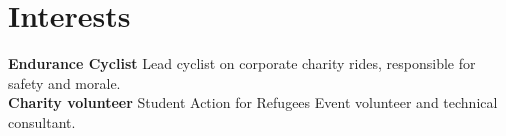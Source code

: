 \documentclass[11pt]{article}
\begin{document}
\section*{Interests}

\textbf{Endurance Cyclist} Lead cyclist on corporate charity rides, responsible for safety and morale.\\
\noindent \textbf{Charity volunteer} Student Action for Refugees Event volunteer and technical consultant.

\end{document}

